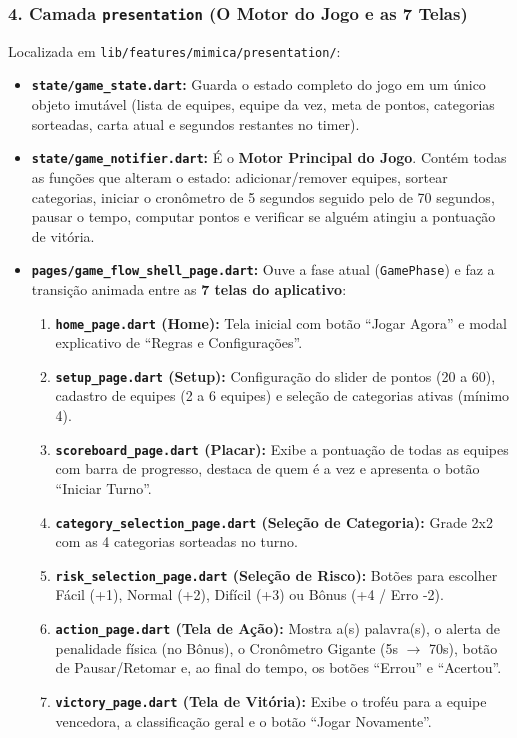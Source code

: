 \documentclass[12pt,a4paper]{article}
\begin{document}
\subsubsection{4. Camada \texttt{presentation} (O Motor do Jogo e as 7 Telas)}
Localizada em \texttt{lib/features/mimica/presentation/}:
\begin{itemize}
  \item \textbf{\texttt{state/game\_state.dart}:} Guarda o estado completo do jogo em um único objeto imutável (lista de equipes, equipe da vez, meta de pontos, categorias sorteadas, carta atual e segundos restantes no timer).
  \item \textbf{\texttt{state/game\_notifier.dart}:} É o \textbf{Motor Principal do Jogo}. Contém todas as funções que alteram o estado: adicionar/remover equipes, sortear categorias, iniciar o cronômetro de 5 segundos seguido pelo de 70 segundos, pausar o tempo, computar pontos e verificar se alguém atingiu a pontuação de vitória.
  \item \textbf{\texttt{pages/game\_flow\_shell\_page.dart}:} Ouve a fase atual (\texttt{GamePhase}) e faz a transição animada entre as \textbf{7 telas do aplicativo}:
    \begin{enumerate}
      \item \textbf{\texttt{home\_page.dart} (Home):} Tela inicial com botão ``Jogar Agora'' e modal explicativo de ``Regras e Configurações''.
      \item \textbf{\texttt{setup\_page.dart} (Setup):} Configuração do slider de pontos (20 a 60), cadastro de equipes (2 a 6 equipes) e seleção de categorias ativas (mínimo 4).
      \item \textbf{\texttt{scoreboard\_page.dart} (Placar):} Exibe a pontuação de todas as equipes com barra de progresso, destaca de quem é a vez e apresenta o botão ``Iniciar Turno''.
      \item \textbf{\texttt{category\_selection\_page.dart} (Seleção de Categoria):} Grade 2x2 com as 4 categorias sorteadas no turno.
      \item \textbf{\texttt{risk\_selection\_page.dart} (Seleção de Risco):} Botões para escolher Fácil (+1), Normal (+2), Difícil (+3) ou Bônus (+4 / Erro -2).
      \item \textbf{\texttt{action\_page.dart} (Tela de Ação):} Mostra a(s) palavra(s), o alerta de penalidade física (no Bônus), o Cronômetro Gigante (5s $\rightarrow$ 70s), botão de Pausar/Retomar e, ao final do tempo, os botões ``Errou'' e ``Acertou''.
      \item \textbf{\texttt{victory\_page.dart} (Tela de Vitória):} Exibe o troféu para a equipe vencedora, a classificação geral e o botão ``Jogar Novamente''.
    \end{enumerate}
\end{itemize}
\end{document}
